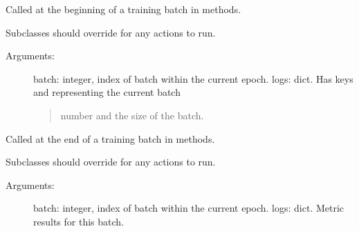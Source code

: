 \documentclass[letterpaper,10pt,english]{sphinxmanual}
\begin{document}
\begin{fulllineitems}
\begin{fulllineitems}
\begin{description}
\begin{description}
\end{description}

\end{description}

\end{fulllineitems}


\begin{fulllineitems}
\label{\detokenize{engine/schedulers/one_cycle:engine.schedulers.one_cycle.OneCycleScheduler.on_train_batch_begin}}
Called at the beginning of a training batch in  methods.

Subclasses should override for any actions to run.
\begin{description}
\item[{Arguments:}] \leavevmode
batch: integer, index of batch within the current epoch.
logs: dict. Has keys  and  representing the current batch
\begin{quote}

number and the size of the batch.
\end{quote}

\end{description}

\end{fulllineitems}


\begin{fulllineitems}
\label{\detokenize{engine/schedulers/one_cycle:engine.schedulers.one_cycle.OneCycleScheduler.on_train_batch_end}}
Called at the end of a training batch in  methods.

Subclasses should override for any actions to run.
\begin{description}
\item[{Arguments:}] \leavevmode
batch: integer, index of batch within the current epoch.
logs: dict. Metric results for this batch.


\end{description}
\end{fulllineitems}
\end{fulllineitems}
\end{document}
